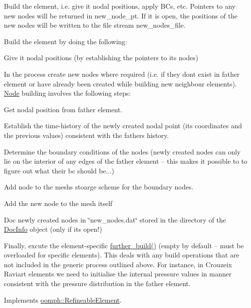 Build the element, i.\+e. give it nodal positions, apply B\+Cs, etc. Pointers to any new nodes will be returned in new\+\_\+node\+\_\+pt. If it is open, the positions of the new nodes will be written to the file stream new\+\_\+nodes\+\_\+file. 

Build the element by doing the following\+:
\begin{DoxyItemize}
\item Give it nodal positions (by establishing the pointers to its nodes)
\item In the process create new nodes where required (i.\+e. if they don\textquotesingle{}t exist in father element or have already been created while building new neighbour elements). \hyperlink{classoomph_1_1Node}{Node} building involves the following steps\+:
\begin{DoxyItemize}
\item Get nodal position from father element.
\item Establish the time-\/history of the newly created nodal point (its coordinates and the previous values) consistent with the father\textquotesingle{}s history.
\item Determine the boundary conditions of the nodes (newly created nodes can only lie on the interior of any edges of the father element -- this makes it possible to to figure out what their bc should be...)
\item Add node to the mesh\textquotesingle{}s stoarge scheme for the boundary nodes.
\item Add the new node to the mesh itself
\item Doc newly created nodes in \char`\"{}new\+\_\+nodes.\+dat\char`\"{} stored in the directory of the \hyperlink{classoomph_1_1DocInfo}{Doc\+Info} object (only if it\textquotesingle{}s open!)
\end{DoxyItemize}
\item Finally, excute the element-\/specific \hyperlink{classoomph_1_1RefineableElement_a26628ce36dfad028686adeb4694a9ef3}{further\+\_\+build()} (empty by default -- must be overloaded for specific elements). This deals with any build operations that are not included in the generic process outlined above. For instance, in Crouzeix Raviart elements we need to initialise the internal pressure values in manner consistent with the pressure distribution in the father element. 
\end{DoxyItemize}

Implements \hyperlink{classoomph_1_1RefineableElement_adc31f0903b4cbd9574017dda44cf6523}{oomph\+::\+Refineable\+Element}.



